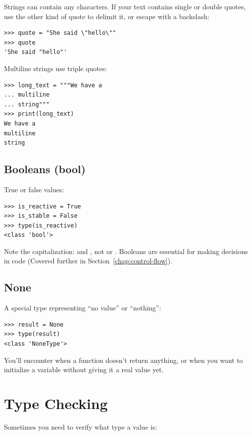 Strings can contain any characters. If your text contains single or double quotes, use the other kind of quote to delimit it, or escape with a backslash:

\begin{lstlisting}
>>> quote = "She said \"hello\""
>>> quote
'She said "hello"'
\end{lstlisting}

Multiline strings use triple quotes:

\begin{lstlisting}
>>> long_text = """We have a
... multiline
... string"""
>>> print(long_text)
We have a
multiline
string
\end{lstlisting}

\subsection{Booleans (bool)}

True or false values:

\begin{lstlisting}
>>> is_reactive = True
>>> is_stable = False
>>> type(is_reactive)
<class 'bool'>
\end{lstlisting}

Note the capitalization:  and , not  or . Booleans are essential for making decisions in code (Covered further in Section~\ref{chap:control-flow}).

\subsection{None}

A special type representing ``no value'' or ``nothing'':

\begin{lstlisting}
>>> result = None
>>> type(result)
<class 'NoneType'>
\end{lstlisting}

You'll encounter  when a function doesn't return anything, or when you want to initialize a variable without giving it a real value yet.

\section{Type Checking}
\label{sec:type-checking}

Sometimes you need to verify what type a value is:

